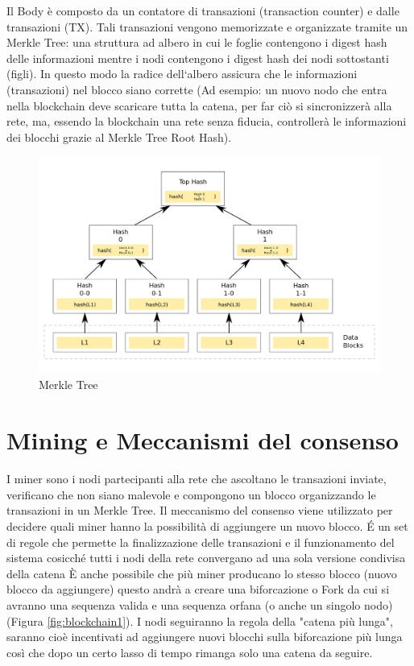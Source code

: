 \documentclass[11pt,a4paper,titlepage,twoside,openright]{report}
\begin{document}
Il Body è composto da un contatore di transazioni (transaction counter) e dalle transazioni (TX). Tali transazioni vengono memorizzate e organizzate tramite un Merkle Tree: una struttura ad albero in cui le foglie contengono i digest hash delle informazioni mentre i nodi contengono i digest hash dei nodi sottostanti (figli). In  questo modo la radice dell`albero assicura che le informazioni (transazioni) nel blocco siano corrette (Ad esempio: un nuovo nodo che entra nella blockchain deve scaricare tutta la catena, per far ciò si sincronizzerà alla rete, ma, essendo la blockchain una rete senza fiducia, controllerà le informazioni dei blocchi grazie al Merkle Tree Root Hash).
\begin{figure}[h]
	\includegraphics[width=\textwidth]{Hash_Tree}
	\centering
	\caption{Merkle Tree}
	\label{fig:Tree1}
\end{figure}

\section{Mining e Meccanismi del consenso}
I miner sono i nodi partecipanti alla rete che  ascoltano le transazioni inviate, verificano che non siano malevole e compongono un blocco organizzando le transazioni in un Merkle Tree.
Il meccanismo del consenso viene utilizzato  per decidere quali miner hanno la possibilità di aggiungere un nuovo blocco.
É un set di regole che permette la finalizzazione delle transazioni e il funzionamento del sistema cosicché tutti i nodi della rete convergano ad una sola versione condivisa della catena
È anche possibile che più miner producano lo stesso blocco (nuovo blocco da aggiungere) questo andrà a creare una biforcazione o Fork da cui si avranno una sequenza valida e una sequenza orfana (o anche un singolo nodo) (Figura \ref{fig:blockchain1}). I nodi seguiranno la regola della "catena più lunga", saranno cioè incentivati ad aggiungere nuovi blocchi sulla biforcazione più lunga così che dopo un certo lasso di tempo rimanga solo una catena da seguire. 
\end{document}
